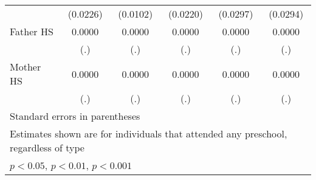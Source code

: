 \begin{table}[htbp]
\begin{tabular}{l*{5}{c}}
            &    (0.0226)         &    (0.0102)         &    (0.0220)         &    (0.0297)         &    (0.0294)         \\
\addlinespace
Father HS   &      0.0000         &      0.0000         &      0.0000         &      0.0000         &      0.0000         \\
            &         (.)         &         (.)         &         (.)         &         (.)         &         (.)         \\
\addlinespace
Mother HS   &      0.0000         &      0.0000         &      0.0000         &      0.0000         &      0.0000         \\
            &         (.)         &         (.)         &         (.)         &         (.)         &         (.)         \\
\bottomrule
\multicolumn{6}{l}{\footnotesize Standard errors in parentheses}\\
\multicolumn{6}{l}{\footnotesize Estimates shown are for individuals that attended any preschool, regardless of type}\\
\multicolumn{6}{l}{\footnotesize \sym{*} \(p<0.05\), \sym{**} \(p<0.01\), \sym{***} \(p<0.001\)}\\
\end{tabular}
\end{table}
